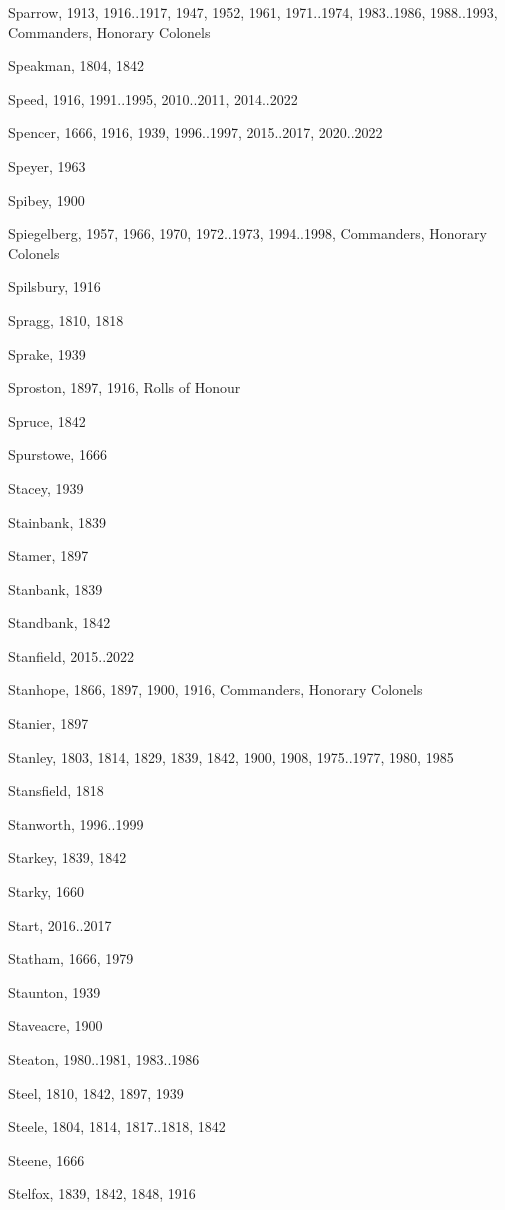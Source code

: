 \begin{theindex}
\item Sparrow, 1913, 1916..1917, 1947, 1952, 1961, 1971..1974, 1983..1986, 1988..1993, Commanders, Honorary Colonels
\item Speakman, 1804, 1842
\item Speed, 1916, 1991..1995, 2010..2011, 2014..2022
\item Spencer, 1666, 1916, 1939, 1996..1997, 2015..2017, 2020..2022
\item Speyer, 1963
\item Spibey, 1900
\item Spiegelberg, 1957, 1966, 1970, 1972..1973, 1994..1998, Commanders, Honorary Colonels
\item Spilsbury, 1916
\item Spragg, 1810, 1818
\item Sprake, 1939
\item Sproston, 1897, 1916, Rolls of Honour
\item Spruce, 1842
\item Spurstowe, 1666
\item Stacey, 1939
\item Stainbank, 1839
\item Stamer, 1897
\item Stanbank, 1839
\item Standbank, 1842
\item Stanfield, 2015..2022
\item Stanhope, 1866, 1897, 1900, 1916, Commanders, Honorary Colonels
\item Stanier, 1897
\item Stanley, 1803, 1814, 1829, 1839, 1842, 1900, 1908, 1975..1977, 1980, 1985
\item Stansfield, 1818
\item Stanworth, 1996..1999
\item Starkey, 1839, 1842
\item Starky, 1660
\item Start, 2016..2017
\item Statham, 1666, 1979
\item Staunton, 1939
\item Staveacre, 1900
\item Steaton, 1980..1981, 1983..1986
\item Steel, 1810, 1842, 1897, 1939
\item Steele, 1804, 1814, 1817..1818, 1842
\item Steene, 1666
\item Stelfox, 1839, 1842, 1848, 1916

\end{theindex}
